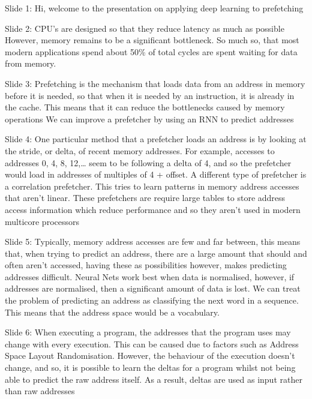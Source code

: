 \documentclass[11pt]{article}
\author{Chetan Mistry}
\date{\today}
\title{}
\begin{document}
\tableofcontents

Slide 1: Hi, welcome to the presentation on applying deep learning to prefetching

Slide 2: CPU's are designed so that they reduce latency as much as possible
         However, memory remains to be a significant bottleneck. So much so, that
         most modern applications spend about 50\% of total cycles are spent waiting
         for data from memory.

Slide 3: Prefetching is the mechanism that loads data from an address in memory
         before it is needed, so that when it is needed by an instruction,
         it is already in the cache.
         This means that it can reduce the bottlenecks caused by memory operations
         We can improve a prefetcher by using an RNN to predict addresses

Slide 4: One particular method that a prefetcher loads an address is by
         looking at the stride, or delta, of recent memory addresses.
         For example, accesses to addresses 0, 4, 8, 12,\ldots{} seem to be
         following a delta of 4, and so the prefetcher would load in addresses
         of multiples of 4 + offset.
         A different type of prefetcher is a correlation prefetcher. This tries
         to learn patterns in memory address accesses that aren't linear.
         These prefetchers are require large tables to store address access
         information which reduce performance and so they aren't used in
         modern multicore processors

Slide 5: Typically, memory address accesses are few and far between, this means
         that, when trying to predict an address, there are a large amount that
         should and often aren't accessed, having these as possibilities however,
         makes predicting addresses difficult.
         Neural Nets work best when data is normalised, however, if addresses are
         normalised, then a significant amount of data is lost.
         We can treat the problem of predicting an address as classifying the
         next word in a sequence. This means that the address space would be a
         vocabulary.

Slide 6: When executing a program, the addresses that the program uses may change
         with every execution. This can be caused due to factors such as
         Address Space Layout Randomisation.
         However, the behaviour of the execution doesn't change, and so,
         it is possible to learn the deltas for a program whilst not being able
         to predict the raw address itself.
         As a result, deltas are used as input rather than raw addresses
\end{document}
